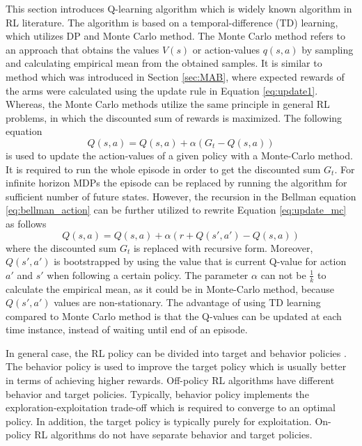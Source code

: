 \documentclass[english, 12pt, a4paper, elec, utf8, a-1b, online]{aaltothesis}
\begin{document}
This section introduces Q-learning algorithm which is widely known algorithm in RL literature. 
The algorithm is based on a temporal-difference (TD) learning, which utilizes DP and Monte Carlo method. 
The Monte Carlo method refers to an approach that obtains the values $V(s)$ or action-values $q(s, a)$ by sampling and calculating empirical mean from the obtained samples. 
It is similar to method which was introduced in Section \ref{sec:MAB}, where expected rewards of the arms were calculated using the update rule in Equation \eqref{eq:update1}. 
Whereas, the Monte Carlo methods utilize the same principle in general RL problems, in which the discounted sum of rewards is maximized. 
The following equation 
\begin{equation}\label{eq:update_mc}
    Q(s, a) = Q(s, a) + \alpha (G_t - Q(s, a))
\end{equation}
is used to update the action-values of a given policy with a Monte-Carlo method. 
It is required to run the whole episode in order to get the discounted sum $G_t$.
For infinite horizon MDPs the episode can be replaced by running the algorithm for sufficient number of future states.
However, the recursion in the Bellman equation \eqref{eq:bellman_action} can be further utilized to rewrite Equation \eqref{eq:update_mc} as follows 
\begin{equation}\label{eq:update_td}
    Q(s, a) = Q(s, a) + \alpha \left( r + Q(s', a') - Q(s, a) \right)
\end{equation}
where the discounted sum $G_t$ is replaced with recursive form.
Moreover, $Q(s', a')$ is bootstrapped by using the value that is current Q-value for action $a'$ and $s'$ when following a certain policy.
The parameter $\alpha$ can not be $\frac{1}{k}$ to calculate the empirical mean, as it could be in Monte-Carlo method, because $Q(s', a')$ values are non-stationary.
The advantage of using TD learning compared to Monte Carlo method is that the Q-values can be updated at each time instance, instead of waiting until end of an episode.

In general case, the RL policy can be divided into target and behavior policies \cite{Sutton2018}.
The behavior policy is used to improve the target policy which is usually better in terms of achieving higher rewards.
Off-policy RL algorithms have different behavior and target policies.
Typically, behavior policy implements the exploration-exploitation trade-off which is required to converge to an optimal policy. 
In addition, the target policy is typically purely for exploitation. 
On-policy RL algorithms do not have separate behavior and target policies. 
\end{document}
